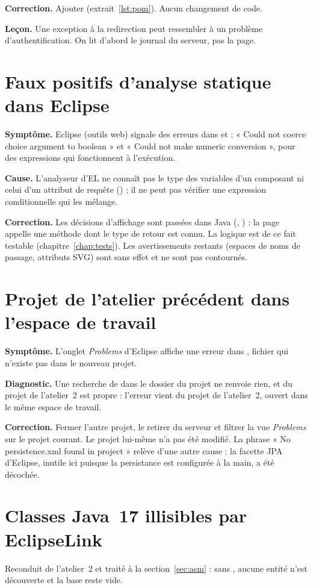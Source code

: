 \textbf{Correction.} Ajouter  (extrait~\ref{lst:pom}). Aucun changement de code.

\textbf{Leçon.} Une exception à la redirection peut ressembler à un problème d'authentification. On lit d'abord le
journal du serveur, pas la page.

\section{Faux positifs d'analyse statique dans Eclipse}
\textbf{Symptôme.} Eclipse (outils web) signale des erreurs dans  et  :
« Could not coerce choice argument to boolean » et « Could not make numeric conversion », pour des expressions qui
fonctionnent à l'exécution.

\textbf{Cause.} L'analyseur d'EL ne connaît pas le type des variables d'un composant ni celui d'un attribut de requête
() ; il ne peut pas vérifier une expression conditionnelle qui les mélange.

\textbf{Correction.} Les décisions d'affichage sont passées dans Java (, ) : la page
appelle une méthode dont le type de retour est connu. La logique est de ce fait testable (chapitre~\ref{chap:tests}).
Les avertissements restants (espaces de noms de passage, attributs SVG) sont sans effet et ne sont pas contournés.

\section{Projet de l'atelier précédent dans l'espace de travail}
\textbf{Symptôme.} L'onglet \textit{Problems} d'Eclipse affiche une erreur dans , fichier qui n'existe pas dans le
nouveau projet.

\textbf{Diagnostic.} Une recherche de  dans le dossier du projet ne renvoie rien, et  du projet de l'atelier~2
est propre : l'erreur vient du projet de l'atelier~2, ouvert dans le même espace de travail.

\textbf{Correction.} Fermer l'autre projet, le retirer du serveur et filtrer la vue \textit{Problems} sur le projet courant. Le
projet lui-même n'a pas été modifié. La phrase « No persistence.xml found in project » relève d'une autre cause :
la facette JPA d'Eclipse, inutile ici puisque la persistance est configurée à la main, a été décochée.

\section{Classes Java~17 illisibles par EclipseLink}
Reconduit de l'atelier~2 et traité à la section~\ref{sec:asm} : sans , aucune entité n'est
découverte et la base reste vide.
